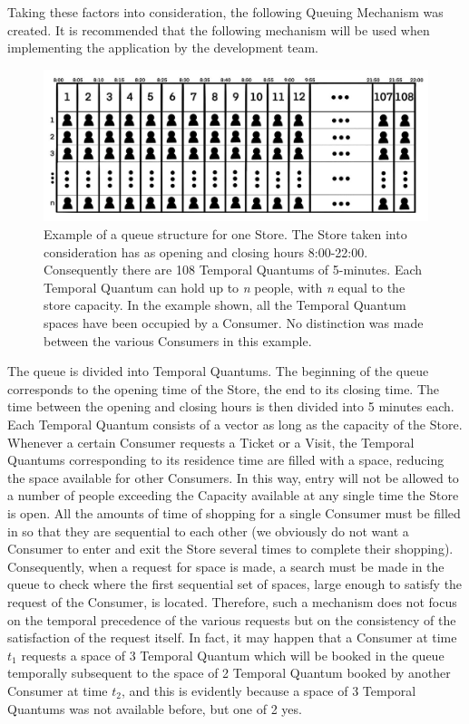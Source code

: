 \documentclass[a4paper, 12pt, oneside, table]{article}
\begin{document}
Taking these factors into consideration, the following Queuing Mechanism was created. It is recommended that the following mechanism will be used when implementing the application by the development team.\\
\begin{figure}[hbt]
\centering
    \centering
    \includegraphics[height=0.2\textheight, scale=0.2, keepaspectratio]{img/queue/queue_general.jpg} 
    \caption{Example of a queue structure for one Store. The Store taken into consideration has as opening and closing hours 8:00-22:00. Consequently there are 108 Temporal Quantums of 5-minutes. Each Temporal Quantum can hold up to \textit{n} people, with \textit{n} equal to the store capacity. In the example shown, all the Temporal Quantum spaces have been occupied by a Consumer. No distinction was made between the various Consumers in this example.}
    \label{entering}
\end{figure}
The queue is divided into Temporal Quantums. The beginning of the queue corresponds to the opening time of the Store, the end to its closing time. The time between the opening and closing hours is then divided into 5 minutes each. Each Temporal Quantum consists of a vector as long as the capacity of the Store. Whenever a certain Consumer requests a Ticket or a Visit, the Temporal Quantums corresponding to its residence time are filled with a space, reducing the space available for other Consumers. In this way, entry will not be allowed to a number of people exceeding the Capacity available at any single time the Store is open. All the amounts of time of shopping for a single Consumer must be filled in so that they are sequential to each other (we obviously do not want a Consumer to enter and exit the Store several times to complete their shopping). Consequently, when a request for space is made, a search must be made in the queue to check where the first sequential set of spaces, large enough to satisfy the request of the Consumer, is located. Therefore, such a mechanism does not focus on the temporal precedence of the various requests but on the consistency of the satisfaction of the request itself. In fact, it may happen that a Consumer at time $t_1$ requests a space of 3 Temporal Quantum which will be booked in the queue temporally subsequent to the space of 2 Temporal Quantum booked by another Consumer at time $t_2$, and this is evidently because a space of 3 Temporal Quantums was not available before, but one of 2 yes.\\
\end{document}
